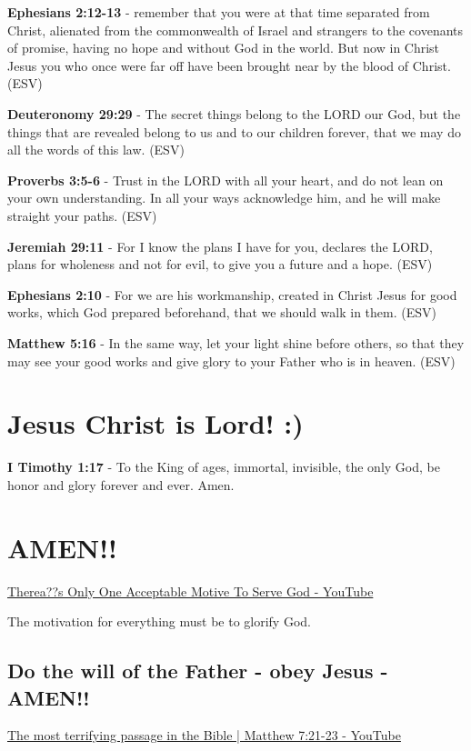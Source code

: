 \documentclass[11pt]{article}
\begin{document}
\textbf{Ephesians 2:12-13} -  remember that you were at that time separated from Christ, alienated from the commonwealth of Israel and strangers to the covenants of promise, having no hope and without God in the world.  But now in Christ Jesus you who once were far off have been brought near by the blood of Christ.  (ESV)

\textbf{Deuteronomy 29:29} -  The secret things belong to the LORD our God, but the things that are revealed belong to us and to our children forever, that we may do all the words of this law.  (ESV)

\textbf{Proverbs 3:5-6} - Trust in the LORD with all your heart, and do not lean on your own understanding. In all your ways acknowledge him, and he will make straight your paths. (ESV)

\textbf{Jeremiah 29:11} -  For I know the plans I have for you, declares the LORD, plans for wholeness and not for evil, to give you a future and a hope.  (ESV)

\textbf{Ephesians 2:10} - For we are his workmanship, created in Christ Jesus for good works, which God prepared beforehand, that we should walk in them. (ESV)

\textbf{Matthew 5:16} - In the same way, let your light shine before others, so that they may see your good works and give glory to your Father who is in heaven. (ESV)

\section{Jesus Christ is Lord! :)}
\label{sec:org0705791}
\textbf{I Timothy 1:17} - To the King of ages, immortal, invisible, the only God, be honor and glory forever and ever. Amen.

\section{AMEN!!}
\label{sec:org1268422}
\href{https://www.youtube.com/watch?v=TEa3UWFgwnk}{Therea??s Only One Acceptable Motive To Serve God - YouTube}

The motivation for everything must be to glorify God.

\subsection{Do the will of the Father - obey Jesus - AMEN!!}
\label{sec:orgbe50741}

\href{https://www.youtube.com/watch?v=v60efH7\_POE\&t=616s}{The most terrifying passage in the Bible | Matthew 7:21-23 - YouTube}
\end{document}

